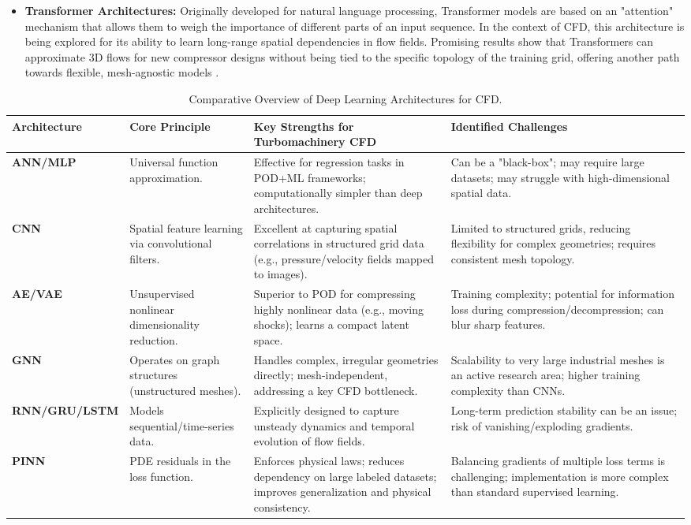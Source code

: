 \documentclass[dsc, EN]{ufabcFHZh}
\begin{document}
\begin{itemize}
    \item \textbf{Transformer Architectures:} Originally developed for natural language processing, Transformer models are based on an "attention" mechanism that allows them to weigh the importance of different parts of an input sequence. In the context of CFD, this architecture is being explored for its ability to learn long-range spatial dependencies in flow fields. Promising results show that Transformers can approximate 3D flows for new compressor designs without being tied to the specific topology of the training grid, offering another path towards flexible, mesh-agnostic models \citep{synthesized2024}.
\end{itemize}

\begin{table}[h!]
\centering
\caption{Comparative Overview of Deep Learning Architectures for CFD.}
\label{tab:dl_architectures}
\begin{tabular}{|p{2.5cm}|p{3.5cm}|p{4.5cm}|p{3.5cm}|}
\hline
\textbf{Architecture} & \textbf{Core Principle} & \textbf{Key Strengths for Turbomachinery CFD} & \textbf{Identified Challenges} \\
\hline
\textbf{ANN/MLP} & Universal function approximation. & Effective for regression tasks in POD+ML frameworks; computationally simpler than deep architectures. & Can be a "black-box"; may require large datasets; may struggle with high-dimensional spatial data. \\
\hline
\textbf{CNN} & Spatial feature learning via convolutional filters. & Excellent at capturing spatial correlations in structured grid data (e.g., pressure/velocity fields mapped to images). & Limited to structured grids, reducing flexibility for complex geometries; requires consistent mesh topology. \\
\hline
\textbf{AE/VAE} & Unsupervised nonlinear dimensionality reduction. & Superior to POD for compressing highly nonlinear data (e.g., moving shocks); learns a compact latent space. & Training complexity; potential for information loss during compression/decompression; can blur sharp features. \\
\hline
\textbf{GNN} & Operates on graph structures (unstructured meshes). & Handles complex, irregular geometries directly; mesh-independent, addressing a key CFD bottleneck. & Scalability to very large industrial meshes is an active research area; higher training complexity than CNNs. \\
\hline
\textbf{RNN/GRU/LSTM} & Models sequential/time-series data. & Explicitly designed to capture unsteady dynamics and temporal evolution of flow fields. & Long-term prediction stability can be an issue; risk of vanishing/exploding gradients. \\
\hline
\textbf{PINN} & PDE residuals in the loss function. & Enforces physical laws; reduces dependency on large labeled datasets; improves generalization and physical consistency. & Balancing gradients of multiple loss terms is challenging; implementation is more complex than standard supervised learning. \\
\hline
\end{tabular}
\end{table}
\end{document}
